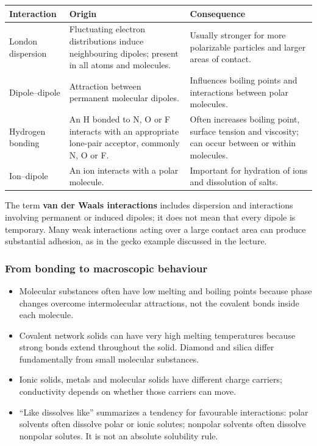 \documentclass[a4paper,10pt]{article}
\begin{document}
\begin{tabularx}{\linewidth}{@{}P{32mm}LL@{}}
\toprule
Interaction & Origin & Consequence \\
\midrule
London dispersion & Fluctuating electron distributions induce neighbouring dipoles;
present in all atoms and molecules. & Usually stronger for more polarizable
particles and larger areas of contact. \\
Dipole--dipole & Attraction between permanent molecular dipoles. & Influences
boiling points and interactions between polar molecules. \\
Hydrogen bonding & An H bonded to N, O or F interacts with an appropriate lone-pair
acceptor, commonly N, O or F. & Often increases boiling point, surface tension
and viscosity; can occur between or within molecules. \\
Ion--dipole & An ion interacts with a polar molecule. & Important for hydration
of ions and dissolution of salts. \\
\bottomrule
\end{tabularx}

The term \textbf{van der Waals interactions} includes dispersion and interactions
involving permanent or induced dipoles; it does not mean that every dipole is
temporary. Many weak interactions acting over a large contact area can produce
substantial adhesion, as in the gecko example discussed in the lecture.


\subsubsection{From bonding to macroscopic behaviour}
\begin{itemize}
  \item Molecular substances often have low melting and boiling points because
  phase changes overcome intermolecular attractions, not the covalent bonds
  inside each molecule.
  \item Covalent network solids can have very high melting temperatures because
  strong bonds extend throughout the solid. Diamond and silica differ fundamentally
  from small molecular substances.
  \item Ionic solids, metals and molecular solids have different charge carriers;
  conductivity depends on whether those carriers can move.
  \item ``Like dissolves like'' summarizes a tendency for favourable interactions:
  polar solvents often dissolve polar or ionic solutes; nonpolar solvents often
  dissolve nonpolar solutes. It is not an absolute solubility rule.
\end{itemize}
\end{document}
